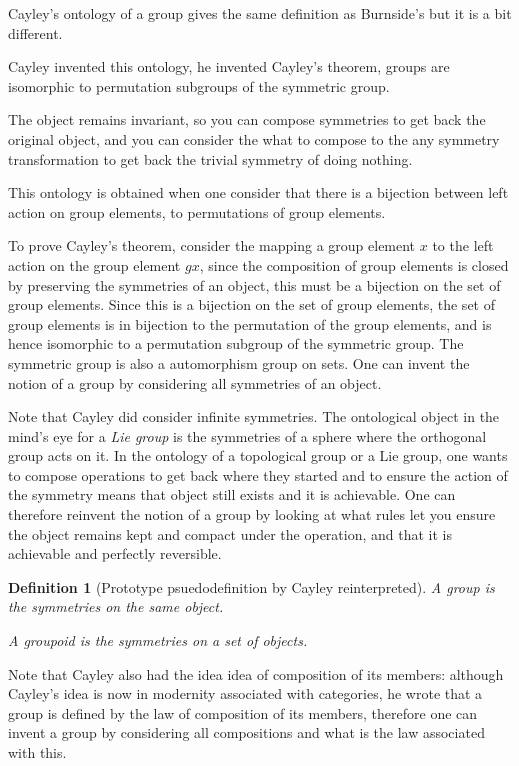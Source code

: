 \documentclass{tufte-book}
\newtheorem{definition}[theorem]{Definition}
\begin{document}
Cayley's ontology of a group gives the same definition as Burnside's but it is a bit different.

Cayley invented this ontology, he invented Cayley's theorem, groups are isomorphic to permutation subgroups of the symmetric group. 

The object remains invariant, so you can compose symmetries to get back the original object, and you can consider the what to compose to the any symmetry transformation to get back the trivial symmetry of doing nothing. 

This ontology is obtained when one consider that there is a bijection between left action on group elements, to permutations of group elements. 

To prove Cayley's theorem, consider the mapping a group element $x$ to the left action on the group element $gx$, since the composition of group elements is closed by preserving the symmetries of an object, this must be a bijection on the set of group elements. Since this is a bijection on the set of group elements, the set of group elements is in bijection to the permutation of the group elements, and is hence isomorphic to a permutation subgroup of the symmetric group. The symmetric group is also a automorphism group on sets. One can invent the notion of a group by considering all symmetries of an object.

Note that Cayley did consider infinite symmetries. The ontological object in the mind's eye for a \textit{Lie group} is the symmetries of a sphere where the orthogonal group acts on it. In the ontology of a topological group or a Lie group, one wants to compose operations to get back where they started and to ensure the action of the symmetry means that object still exists and it is achievable. One can therefore reinvent the notion of a group by looking at what rules let you ensure the object remains kept and compact under the operation, and that it is achievable and perfectly reversible.

\begin{definition}[Prototype psuedodefinition by Cayley reinterpreted]
  A group is the symmetries on the same object.
  
  A groupoid is the symmetries on a set of objects.
\end{definition}

Note that Cayley also had the idea idea of composition of its members: although Cayley's idea is now in modernity associated with categories, he wrote that a group is defined by the law of composition of its members, therefore one can invent a group by considering all compositions and what is the law associated with this.
\end{document}
